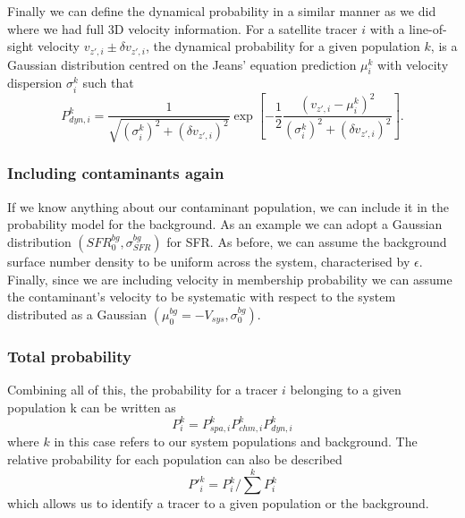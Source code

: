 Finally we can define the dynamical probability in a similar manner as we did where we had full 3D velocity information. For a satellite tracer $i$ with a line-of-sight velocity $v_{z',i} \pm \delta v_{z',i}$, the dynamical probability for a given population $k$, is a Gaussian distribution centred on the Jeans' equation prediction $\mu^k_i$ with velocity dispersion $\sigma^k_i$ such that
\begin{equation}
P^k_{dyn,i} = \frac{1}{\sqrt{(\sigma^k_i)^2+ (\delta v_{z',i})^2}} \exp{\left[-\frac{1}{2}\frac{(v_{z',i}-\mu^k_i)^2}{(\sigma^k_i)^2 + (\delta v_{z',i})^2}\right]}.
\end{equation}
\subsubsection{Including contaminants again}
If we know anything about our contaminant population, we can include it in the probability model for the background. As an example we can adopt a Gaussian distribution $(SFR_0^{bg},\sigma_{SFR}^{bg})$ for SFR. As before, we can assume the background surface number density to be uniform across the system, characterised by $\epsilon$. Finally, since we are including velocity in membership probability we can assume the contaminant's velocity to be systematic with respect to the system distributed as a Gaussian $(\mu_0^{bg}=-V_{sys},\sigma_0^{bg})$. 
\subsubsection{Total probability}
Combining all of this, the probability for a tracer $i$ belonging to a given population k can be written as
\begin{equation}
P_i^{k} = P_{spa,i}^k P_{chm,i}^k P_{dyn,i}^k 
\end{equation}
where $k$ in this case refers to our system populations and background. The relative probability for each population can also be described 
\begin{equation}
P'^k_i = P^k_i / \sum^k P^k_i
\end{equation}
which allows us to identify a tracer to a given population or the background.

